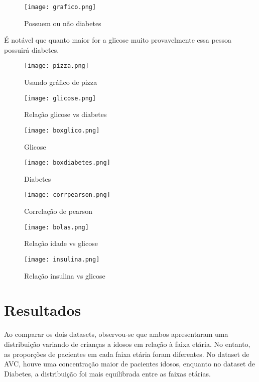 \documentclass[conference]{IEEEtran}
\begin{document}
 \begin{figure}[H]
    \centering
   \caption{Possuem ou não diabetes}
   \texttt{[image: grafico.png]}
 \end{figure}

É notável que quanto maior for a glicose muito provavelmente essa pessoa possuirá diabetes.

\begin{figure}[H]
    \centering
   \caption{Usando gráfico de pizza}
   \texttt{[image: pizza.png]}
\end{figure}

  \begin{figure}[H]
    \centering
   \caption{Relação glicose vs diabetes}
   \texttt{[image: glicose.png]}
 \end{figure}

   \begin{figure}[H]
    \centering
    \caption{Glicose }
   \texttt{[image: boxglico.png]}
   \end{figure}

\begin{figure}[H]
    \centering
    \caption{Diabetes}
   \texttt{[image: boxdiabetes.png]}
\end{figure}



\begin{figure}[H]
    \centering
   \caption{Correlação de pearson}
   \texttt{[image: corrpearson.png]}
\end{figure}

\begin{figure}[H]
    \centering
    \caption{Relação idade vs glicose}
   \texttt{[image: bolas.png]}
\end{figure}

\begin{figure}[H]
    \centering
    \caption{Relação insulina vs glicose}
   \texttt{[image: insulina.png]}
\end{figure}



\section{Resultados}
Ao comparar os dois datasets, observou-se que ambos apresentaram uma distribuição variando de crianças a idosos em relação à faixa etária. No entanto, as proporções de pacientes em cada faixa etária foram diferentes. No dataset de AVC, houve uma concentração maior de pacientes idosos, enquanto no dataset de Diabetes, a distribuição foi mais equilibrada entre as faixas etárias.
\end{document}
